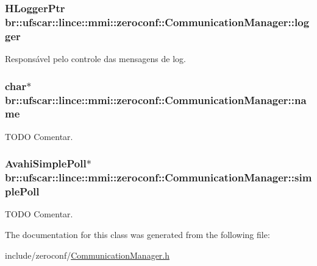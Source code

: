\hypertarget{classbr_1_1ufscar_1_1lince_1_1mmi_1_1zeroconf_1_1CommunicationManager_aca59ba5611ac71c96c668a6bad73405a}{
\subsubsection[{logger}]{\setlength{\rightskip}{0pt plus 5cm}HLoggerPtr {\bf br::ufscar::lince::mmi::zeroconf::CommunicationManager::logger}}}
\label{classbr_1_1ufscar_1_1lince_1_1mmi_1_1zeroconf_1_1CommunicationManager_aca59ba5611ac71c96c668a6bad73405a}


Responsável pelo controle das mensagens de log. 

\hypertarget{classbr_1_1ufscar_1_1lince_1_1mmi_1_1zeroconf_1_1CommunicationManager_aed1f1d17b6d93eee2a4b31db0530e9dd}{
\subsubsection[{name}]{\setlength{\rightskip}{0pt plus 5cm}char$\ast$ {\bf br::ufscar::lince::mmi::zeroconf::CommunicationManager::name}}}
\label{classbr_1_1ufscar_1_1lince_1_1mmi_1_1zeroconf_1_1CommunicationManager_aed1f1d17b6d93eee2a4b31db0530e9dd}


TODO Comentar. 

\hypertarget{classbr_1_1ufscar_1_1lince_1_1mmi_1_1zeroconf_1_1CommunicationManager_abe4f838b42e69ac6c597c9e83a2962ff}{
\subsubsection[{simplePoll}]{\setlength{\rightskip}{0pt plus 5cm}AvahiSimplePoll$\ast$ {\bf br::ufscar::lince::mmi::zeroconf::CommunicationManager::simplePoll}}}
\label{classbr_1_1ufscar_1_1lince_1_1mmi_1_1zeroconf_1_1CommunicationManager_abe4f838b42e69ac6c597c9e83a2962ff}


TODO Comentar. 



The documentation for this class was generated from the following file:\begin{DoxyCompactItemize}
\item 
include/zeroconf/\hyperlink{CommunicationManager_8h}{CommunicationManager.h}\end{DoxyCompactItemize}
